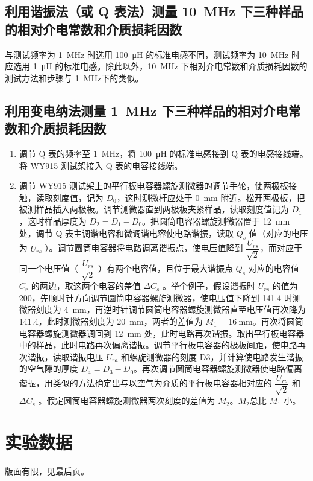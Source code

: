 \documentclass[a4paper,utf8]{article}
\begin{document}
    \subsection{利用谐振法（或 Q 表法）测量 \SI{10}{\mega\hertz} 下三种样品的相对介电常数和介质损耗因数}
        与测试频率为 \SI{1}{\mega\hertz} 时选用 \SI{100}{\micro\henry} 的标准电感不同，测试频率为 \SI{10}{\mega\hertz} 时应选用 \SI{1}{\micro\henry} 的标准电感。除此以外，\SI{10}{\mega\hertz} 下相对介电常数和介质损耗因数的测试方法和步骤与 \SI{1}{\mega\hertz}下的类似。
    \subsection{利用变电纳法测量 \SI{1}{\mega\hertz} 下三种样品的相对介电常数和介质损耗因数}
        \begin{enumerate}
            \item 调节 Q 表的频率至 \SI{1}{\mega\hertz}，将 \SI{100}{\micro\henry} 的标准电感接到 Q 表的电感接线端。将 WY915 测试架接入 Q 表的电容接线端。
            \item 调节 WY915 测试架上的平行板电容器螺旋测微器的调节手轮，使两极板接触，读取刻度值，记为 $D_0$，这时测微杆应处于 \SI{0}{\milli\metre} 附近。松开两极板，把被测样品插入两极板。调节测微器直到两极板夹紧样品，读取刻度值记为 $D_1$，这时样品厚度为 $D_2 = D_1 - D_0$。把圆筒电容器螺旋测微器置于 \SI{12}{\milli\metre} 处，调节 Q 表主调谐电容和微调谐电容使电路谐振，读取 $Q_s$ 值（对应的电压为 $U_{rs}$ ）。调节圆筒电容器将电路调离谐振点，使电压值降到 $\dfrac{U_{rs}}{\sqrt{2}}$，而对应于同一个电压值（ $\dfrac{U_{rs}}{\sqrt{2}}$ ）有两个电容值，且位于最大谐振点 $Q_s$ 对应的电容值 $C_r$ 的两边，取这两个电容的差值 $\varDelta C_s$ 。举个例子，假设谐振时 $U_{rs}$ 的值为 200，先顺时针方向调节圆筒电容器螺旋测微器，使电压值下降到 141.4 时测微器刻度为 \SI{4}{\milli\metre}，再逆时针调节圆筒电容器螺旋测微器直至电压值再次降为 141.4，此时测微器刻度为 \SI{20}{\milli\metre}，两者的差值为 $M_1=\SI{16}{\milli\metre}$。再次将圆筒电容器螺旋测微器调回到 \SI{12}{\milli\metre} 处，此时电路再次谐振。取出平行板电容器中的样品，此时电路再次偏离谐振。调节平行板电容器的极板间距，使电路再次谐振，读取谐振电压 $U_{ra}$ 和螺旋测微器的刻度 D3，并计算使电路发生谐振的空气隙的厚度 $D_4=D_3-D_0$。再次调节圆筒电容器螺旋测微器使电路偏离谐振，用类似的方法确定出与以空气为介质的平行板电容器相对应的 $\dfrac{U_{rs}}{\sqrt{2}}$ 和 $\varDelta C_s$ 。假定圆筒电容器螺旋测微器两次刻度的差值为 $ M_2 $。$M_2$总比 $M_1$ 小。
        \end{enumerate}
\section{实验数据}
    版面有限，见最后页。
\end{document}
